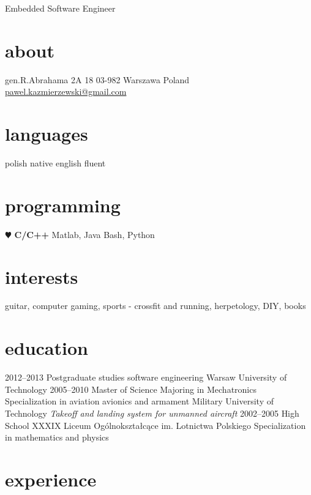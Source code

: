 \documentclass[]{friggeri-cv}
\begin{document}
       {Embedded Software Engineer}


\begin{aside}
  \section{about}
    gen.R.Abrahama 2A 18
    03-982 Warszawa
    Poland
    ~
    \href{mailto:pawel.kazmierzewski@gmail.com}{pawel.kazmierzewski@gmail.com}
  \section{languages}
    polish  native
    english fluent
  \section{programming}
  {\color{red} $\varheartsuit$} {\bf C/C++}
    Matlab, Java
    Bash, Python
\end{aside}

\section{interests}

guitar, computer gaming, sports - crossfit and running, herpetology, DIY, books 

\section{education}

\begin{entrylist}
  \entry
  {2012–2013}
  {Postgraduate studies {\normalfont software engineering}}
  {Warsaw University of Technology}
  {}
  \entry
  {2005–2010}
  {Master of Science
    {\normalfont Majoring in Mechatronics\\
    Specialization in aviation avionics and armament}}
  {Military University of Technology}
  {\emph{Takeoff and landing system for unmanned aircraft}}
  \entry
    {2002–2005}
    {High School}
    {XXXIX Liceum Ogólnokształcące im. Lotnictwa Polskiego}
    {Specialization in mathematics and physics}
\end{entrylist}

\section{experience}
\end{document}
